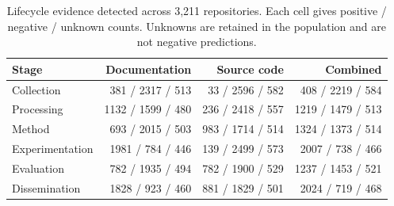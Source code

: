 \begin{table}[t]
\centering
\caption{Lifecycle evidence detected across 3,211 repositories. Each cell gives positive / negative / unknown counts. Unknowns are retained in the population and are not negative predictions.}
\label{tab:corpus-3211}
\begin{tabular}{lrrr}
\toprule
Stage & Documentation & Source code & Combined \\
\midrule
Collection & 381 / 2317 / 513 & 33 / 2596 / 582 & 408 / 2219 / 584 \\
Processing & 1132 / 1599 / 480 & 236 / 2418 / 557 & 1219 / 1479 / 513 \\
Method & 693 / 2015 / 503 & 983 / 1714 / 514 & 1324 / 1373 / 514 \\
Experimentation & 1981 / 784 / 446 & 139 / 2499 / 573 & 2007 / 738 / 466 \\
Evaluation & 782 / 1935 / 494 & 782 / 1900 / 529 & 1237 / 1453 / 521 \\
Dissemination & 1828 / 923 / 460 & 881 / 1829 / 501 & 2024 / 719 / 468 \\
\bottomrule
\end{tabular}
\end{table}
